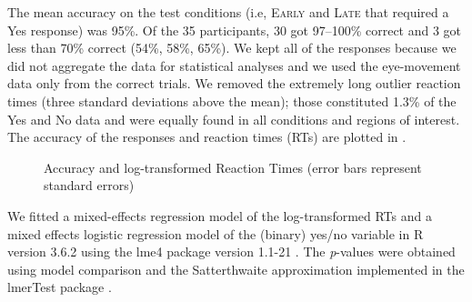 \documentclass[output=paper]{langscibook}
\begin{document}
The mean accuracy on the test conditions (i.e, \textsc{Early} and \textsc{Late} that required a Yes response) was 95\%. Of the 35
participants, 30 got 97--100\% correct and 3 got less than 70\% correct (54\%, 58\%, 65\%). We kept all of the responses
because we did not aggregate the data for statistical analyses and we used the eye-movement data only from the correct
trials. We removed the extremely long outlier reaction times (three standard deviations above the mean); those
constituted 1.3\% of the Yes and No data and were equally found in all conditions and regions of interest. The accuracy
of the responses and reaction times (RTs) are plotted in .




\begin{figure}[] 
\caption{Accuracy and log-transformed Reaction Times (error bars represent standard errors)}
    \label{tom:fig:plots}
\end{figure}



We fitted a mixed-effects regression model of the log-transformed RTs and a mixed effects logistic regression model of
the (binary) yes/no variable in R version 3.6.2 \citep{rcore}  using the lme4 package version 1.1-21 \citet{lme4}. The \textit{p}{}-values were obtained using model comparison and the Satterthwaite approximation implemented in
the lmerTest package \citep{kuznetsova2017lmertest}. 
\end{document}
